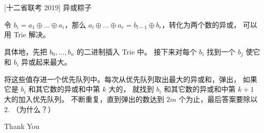\documentclass{beamer}
\begin{document}
\begin{frame}[fragile]{[十二省联考 2019] 异或粽子}
    \small

    令 $b_i=a_1\oplus...\oplus a_i$，那么 $a_l\oplus...\oplus a_r=b_{l-1}\oplus b_r$，转化为两个数的异或，
    可以用 Trie 解决。

    \vspace{1em}\pause
    具体地，先把 $b_0,...,b_n$ 的二进制插入 Trie 中。
    接下来对每个 $b_i$ 找到一个 $b_j$ 使它和 $b_i$ 异或起来最大。

    \vspace{1em}\pause
    将这些值存进一个优先队列中。每次从优先队列取出最大的异或和，弹出，
    如果它是 $b_i$ 和其它数的异或和中第 $k$ 大的，
    就找到 $b_i$ 和其它数的异或和中第 $k+1$ 大的加入优先队列。
    不断重复，直到弹出的数达到 $2m$ 个为止，最后答案要除以 $2$. （为什么？）
\end{frame}

\begin{frame}
    \begin{center}
        {\Huge\calligra Thank You}
    \end{center}
\end{frame}
\end{document}
